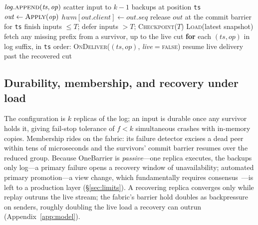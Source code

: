 \begin{algorithm}[tb]
\small
\caption{OneBarrier live and recovery paths (per replica).}
\label{alg:ft}
\begin{algorithmic}[1]
  \State $\mathit{log}.\textsc{append}(\mathit{ts}, \mathit{op})$
     \State scatter input to $k-1$ backups at position \texttt{ts}
  \EndIf
  \State $\mathit{out} \gets \textsc{Apply}(\mathit{op})$
     \State $\mathit{hwm}[\mathit{out}.\mathit{client}] \gets \mathit{out}.\mathit{seq}$
      release $\mathit{out}$ at the commit barrier for \texttt{ts}
     \EndIf
  \EndIf{}
\EndProcedure
{}
  \State finish inputs $\le T$; defer inputs $> T$; \textsc{Checkpoint}($T$)
\EndProcedure
{}
  \State \textsc{Load}(latest snapshot)
  \State fetch any missing prefix from a survivor, up to the live cut
  \State \textbf{for} each $(\mathit{ts}, \mathit{op})$ in log suffix, in \texttt{ts} order: \textsc{OnDeliver}($(\mathit{ts},\mathit{op})$, \textit{live}$=$\textsc{false})
  \State resume live delivery past the recovered cut
\EndProcedure
\end{algorithmic}
\end{algorithm}

\subsection{Durability, membership, and recovery under load}
\label{sec:membership}

The configuration is $k$ replicas of the log; an input is durable once any
survivor holds it, giving fail-stop tolerance of $f<k$ simultaneous
crashes with in-memory copies. Membership rides on the fabric: its failure
detector excises a dead peer within tens of microseconds and the survivors'
commit barrier resumes over the reduced group. Because OneBarrier is
\emph{passive}---one replica executes, the backups only log---a primary
failure opens a recovery window of unavailability; automated primary
promotion---a view change, which fundamentally requires
consensus~\citep{fischer1985impossibility,lamport1998parttime}---is
left to a production layer (\S\ref{sec:limits}). A recovering replica
converges only while replay outruns the live stream; the fabric's
barrier hold doubles as backpressure on senders, roughly doubling the live
load a recovery can outrun (Appendix~\ref{app:model}).

